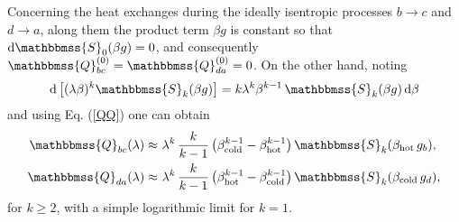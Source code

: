 \documentclass[aps,pra,floatfix,twocolumn,groupedaddress,superscriptaddress,nofootinbib,notitlepage,amsmath,amssymb,]{revtex4-1}
\begin{document}
Concerning the heat exchanges during the ideally isentropic processes $b\rightarrow c$ and $d\rightarrow a$, along them the product term $\beta g$ is constant so that $\mathrm{d}\mathbbmss{S}_0(\beta g)=0$, and consequently $\mathbbmss{Q}^{(0)}_{bc}=\mathbbmss{Q}^{(0)}_{da}=0$. On the other hand, noting
\begin{equation}
\mathrm{d}\left[(\lambda\beta)^{k} \mathbbmss{S}_{k}(\beta g)\right]=k  \lambda^{k} \beta^{k -1}\, \mathbbmss{S}_{k}(\beta g)\,\mathrm{d}\beta
\end{equation}
and using Eq. (\ref{QQ}) one can obtain
\begin{align}
\label{pertheatad1}
\mathbbmss{Q}_{bc}(\lambda)\approx &\ \lambda^{k}\,\frac{k}{k -1}\left(\beta_{\mathrm{cold}}^{k -1}-\beta_{\mathrm{hot}}^{k -1}\right)\mathbbmss{S}_{k}(\beta_{\mathrm{hot}} \, g_b),
\\
\label{pertheatad2}
\mathbbmss{Q}_{da}(\lambda)\approx &\ \lambda^{k}\,\frac{k}{k -1}\left(\beta_{\mathrm{hot}}^{k -1}-\beta_{\mathrm{cold}}^{k -1}\right)\mathbbmss{S}_{k}(\beta_{\mathrm{cold}} \, g_d),
\end{align}
for $k \geqslant 2$, with a simple logarithmic limit for $k =1$.  
\end{document}
